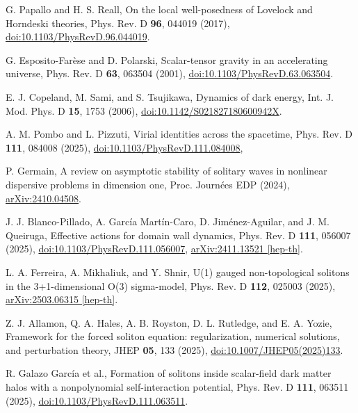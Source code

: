 \documentclass{article}
\begin{document}
\begin{thebibliography}{99}
G. Papallo and H. S. Reall,
On the local well-posedness of Lovelock and Horndeski theories,
Phys. Rev. D \textbf{96}, 044019 (2017),
\href{https://doi.org/10.1103/PhysRevD.96.044019}{doi:10.1103/PhysRevD.96.044019}.

G. Esposito-Farèse and D. Polarski,
Scalar-tensor gravity in an accelerating universe,
Phys. Rev. D \textbf{63}, 063504 (2001),
\href{https://journals.aps.org/prd/abstract/10.1103/PhysRevD.63.063504}{doi:10.1103/PhysRevD.63.063504}.

E. J. Copeland, M. Sami, and S. Tsujikawa,
Dynamics of dark energy,
Int. J. Mod. Phys. D \textbf{15}, 1753 (2006),
\href{https://doi.org/10.1142/S021827180600942X}{doi:10.1142/S021827180600942X}.

A. M. Pombo and L. Pizzuti,
Virial identities across the spacetime,
Phys. Rev. D \textbf{111}, 084008 (2025),
\href{https://doi.org/10.1103/PhysRevD.111.084008}{doi:10.1103/PhysRevD.111.084008},

P. Germain,
A review on asymptotic stability of solitary waves in nonlinear dispersive problems in dimension one,
Proc. Journées EDP (2024),
\href{https://arxiv.org/abs/2410.04508}{arXiv:2410.04508}.

J. J. Blanco-Pillado, A. García Martín-Caro, D. Jiménez-Aguilar, and J. M. Queiruga,
Effective actions for domain wall dynamics,
Phys. Rev. D \textbf{111}, 056007 (2025),
\href{https://doi.org/10.1103/PhysRevD.111.056007}{doi:10.1103/PhysRevD.111.056007},
\href{https://doi.org/10.48550/arXiv.2411.13521}{arXiv:2411.13521 [hep-th]}.


L. A. Ferreira, A. Mikhaliuk, and Y. Shnir,
U(1) gauged non-topological solitons in the 3+1-dimensional O(3) sigma-model,
Phys. Rev. D \textbf{112}, 025003 (2025),
\href{https://doi.org/10.48550/arXiv.2503.06315}{arXiv:2503.06315 [hep-th]}.

Z. J. Allamon, Q. A. Hales, A. B. Royston, D. L. Rutledge, and E. A. Yozie,
Framework for the forced soliton equation: regularization, numerical solutions, and perturbation theory, 
JHEP \textbf{05}, 133 (2025),
\href{https://doi.org/10.1007/JHEP05(2025)133}{doi:10.1007/JHEP05(2025)133}.

R. Galazo García et al.,
Formation of solitons inside scalar-field dark matter halos with a nonpolynomial self-interaction potential, 
Phys. Rev. D \textbf{111}, 063511 (2025),
\href{https://doi.org/10.1103/PhysRevD.111.063511}{doi:10.1103/PhysRevD.111.063511}.



\end{thebibliography}
\end{document}
